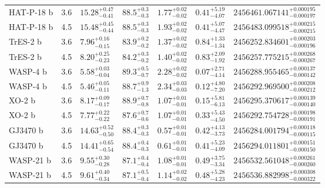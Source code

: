 {\begin{longtable}[h]{lllllll}
HAT-P-18 b   &               3.6 &  ${15.28}^{+0.47}_{-0.41}$ &  ${88.5}^{+0.3}_{-0.3}$ &  ${1.77}^{+0.02}_{-0.02}$ &    ${0.41}^{+5.19}_{-4.07}$ &  ${2456461.067141}^{+0.000195}_{-0.000197}$ \\
HAT-P-18 b   &               4.5 &  ${15.48}^{+0.45}_{-0.44}$ &  ${88.5}^{+0.3}_{-0.3}$ &  ${1.93}^{+0.02}_{-0.02}$ &    ${0.41}^{+5.07}_{-4.47}$ &  ${2456483.099518}^{+0.000215}_{-0.000215}$ \\
TrES-2 b    &               3.6 &   ${7.96}^{+0.16}_{-0.15}$ &  ${83.9}^{+0.2}_{-0.2}$ &  ${1.37}^{+0.02}_{-0.02}$ &    ${0.84}^{+1.33}_{-1.34}$ &  ${2456252.834601}^{+0.000203}_{-0.000196}$ \\
TrES-2 b    &               4.5 &   ${8.20}^{+0.25}_{-0.23}$ &  ${84.2}^{+0.3}_{-0.2}$ &  ${1.40}^{+0.02}_{-0.02}$ &    ${0.83}^{+2.09}_{-1.92}$ &  ${2456257.775215}^{+0.000268}_{-0.000267}$ \\
WASP-4 b    &               3.6 &   ${5.58}^{+0.03}_{-0.04}$ &  ${89.3}^{+0.5}_{-0.7}$ &  ${2.28}^{+0.02}_{-0.02}$ &    ${0.07}^{+2.71}_{-4.14}$ &  ${2456288.955465}^{+0.000137}_{-0.000142}$ \\
WASP-4 b    &               4.5 &   ${5.46}^{+0.05}_{-0.11}$ &  ${88.7}^{+0.9}_{-1.3}$ &  ${2.34}^{+0.03}_{-0.03}$ &    ${0.12}^{+4.80}_{-7.20}$ &  ${2456292.969500}^{+0.000208}_{-0.000212}$ \\
XO-2 b      &               3.6 &   ${8.17}^{+0.09}_{-0.17}$ &  ${88.9}^{+0.7}_{-0.8}$ &  ${1.07}^{+0.01}_{-0.01}$ &    ${0.15}^{+5.81}_{-6.13}$ &  ${2456295.370617}^{+0.000139}_{-0.000140}$ \\
XO-2 b      &               4.5 &   ${7.77}^{+0.22}_{-0.22}$ &  ${87.6}^{+0.7}_{-0.6}$ &  ${1.07}^{+0.01}_{-0.01}$ &    ${0.33}^{+5.43}_{-4.50}$ &  ${2456292.754728}^{+0.000198}_{-0.000191}$ \\
GJ3470 b   &               3.6 &  ${14.63}^{+0.52}_{-0.50}$ &  ${88.4}^{+0.3}_{-0.3}$ &  ${0.57}^{+0.01}_{-0.01}$ &    ${0.42}^{+4.13}_{-3.73}$ &  ${2456284.001794}^{+0.000118}_{-0.000115}$ \\
GJ3470 b   &               4.5 &  ${14.41}^{+0.65}_{-0.54}$ &  ${88.4}^{+0.4}_{-0.3}$ &  ${0.61}^{+0.01}_{-0.01}$ &    ${0.41}^{+5.23}_{-4.09}$ &  ${2456294.011801}^{+0.000151}_{-0.000150}$ \\
WASP-21 b   &               3.6 &   ${9.55}^{+0.30}_{-0.28}$ &  ${87.1}^{+0.4}_{-0.4}$ &  ${1.08}^{+0.01}_{-0.01}$ &    ${0.49}^{+3.75}_{-3.34}$ &  ${2456532.561048}^{+0.000261}_{-0.000260}$ \\
WASP-21 b   &               4.5 &   ${9.61}^{+0.40}_{-0.34}$ &  ${87.1}^{+0.5}_{-0.4}$ &  ${1.14}^{+0.02}_{-0.02}$ &    ${0.48}^{+5.28}_{-4.23}$ &  ${2456536.882998}^{+0.000308}_{-0.000322}$ \\

\end{longtable}}
